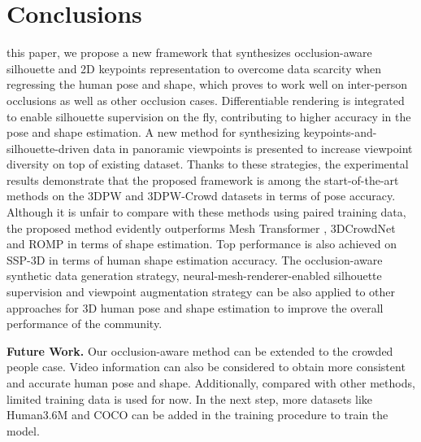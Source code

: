 \documentclass[journal]{IEEEtran}
\begin{document}
\section{Conclusions}
 this paper, we propose a new framework that synthesizes occlusion-aware silhouette and 2D keypoints representation to overcome data scarcity when regressing the human pose and shape, which proves to work well on inter-person occlusions as well as other occlusion cases. Differentiable rendering is integrated to enable silhouette supervision on the fly, contributing to higher accuracy in the pose and shape estimation. A new method for synthesizing keypoints-and-silhouette-driven data in panoramic viewpoints is presented to increase viewpoint diversity on top of existing dataset. Thanks to these strategies, the experimental results demonstrate that the proposed framework is among the start-of-the-art methods on the 3DPW and 3DPW-Crowd datasets in terms of pose accuracy. Although it is unfair to compare with these methods using paired training data, the proposed method evidently outperforms Mesh Transformer \cite{lin2021end-to-end}, 3DCrowdNet \cite{choi20213dcrowdnet} and ROMP \cite{ROMP} in terms of shape estimation. Top performance is also achieved on SSP-3D in terms of human shape estimation accuracy. The occlusion-aware synthetic data generation strategy, neural-mesh-renderer-enabled silhouette supervision and viewpoint augmentation strategy can be also applied to other approaches for 3D human pose and shape estimation to improve the overall performance of the community.

\noindent\textbf{Future Work.}  Our occlusion-aware method can be extended to the crowded people case. Video information can also be considered to obtain more consistent and accurate human pose and shape. Additionally, compared with other methods, limited training data is used for now. In the next step, more datasets like Human3.6M and COCO can be added in the training procedure to train the model.
\end{document}
